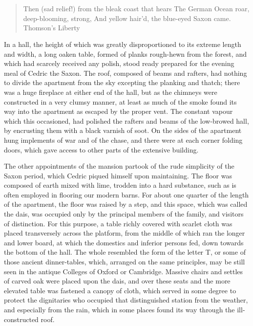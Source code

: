 \chapter{}

\begin{quote}
Then (sad relief!) from the bleak coast that hears
The German Ocean roar, deep-blooming, strong,
And yellow hair'd, the blue-eyed Saxon came.
Thomson's Liberty
\end{quote}

In a hall, the height of which was greatly disproportioned to its
extreme length and width, a long oaken table, formed of planks
rough-hewn from the forest, and which had scarcely received any polish,
stood ready prepared for the evening meal of Cedric the Saxon. The roof,
composed of beams and rafters, had nothing to divide the apartment from
the sky excepting the planking and thatch; there was a huge fireplace at
either end of the hall, but as the chimneys were constructed in a very
clumsy manner, at least as much of the smoke found its way into the
apartment as escaped by the proper vent. The constant vapour which this
occasioned, had polished the rafters and beams of the low-browed hall,
by encrusting them with a black varnish of soot. On the sides of the
apartment hung implements of war and of the chase, and there were at
each corner folding doors, which gave access to other parts of the
extensive building.

The other appointments of the mansion partook of the rude simplicity of
the Saxon period, which Cedric piqued himself upon maintaining. The
floor was composed of earth mixed with lime, trodden into a hard
substance, such as is often employed in flooring our modern barns. For
about one quarter of the length of the apartment, the floor was raised
by a step, and this space, which was called the dais, was occupied only
by the principal members of the family, and visitors of distinction. For
this purpose, a table richly covered with scarlet cloth was placed
transversely across the platform, from the middle of which ran the
longer and lower board, at which the domestics and inferior persons fed,
down towards the bottom of the hall. The whole resembled the form of the
letter T, or some of those ancient dinner-tables, which, arranged on the
same principles, may be still seen in the antique Colleges of Oxford or
Cambridge. Massive chairs and settles of carved oak were placed upon the
dais, and over these seats and the more elevated table was fastened a
canopy of cloth, which served in some degree to protect the dignitaries
who occupied that distinguished station from the weather, and especially
from the rain, which in some places found its way through the
ill-constructed roof.

